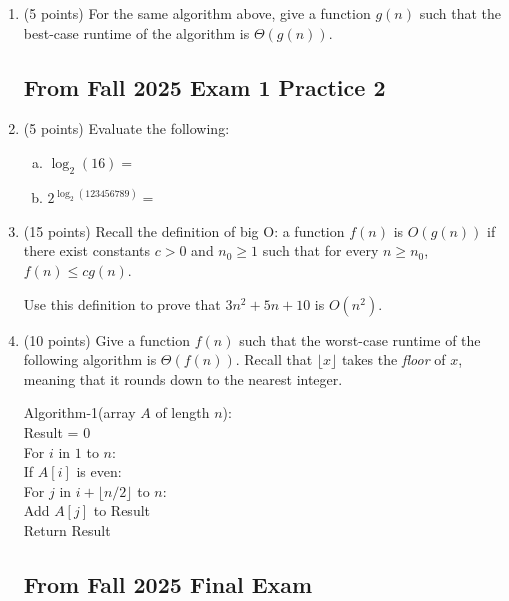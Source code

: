 \documentclass[11pt]{article}
\begin{document}
\begin{enumerate}
    \vspace{1in}

\item (5 points) 
For the same algorithm above, give a function $g(n)$ such that the best-case
runtime of the algorithm is $\Theta(g(n))$.


\newpage

\subsection*{From Fall 2025 Exam 1 Practice 2}
\item (5 points)
Evaluate the following:

\begin{enumerate}[(a)]
    \item $\log_2(16) = $ 
    \item $2^{\log_2(123456789)} = $
\end{enumerate}

\item (15 points) Recall the definition of big O: a function $f(n)$ is $O(g(n))$ if there
exist constants $c > 0$ and $n_0 \geq 1$ such that for every $n \geq n_0$, $f(n)
\leq c g(n)$.

Use this definition to prove that $3n^2 + 5n + 10$ is $O(n^2)$.

\vspace{3in}

\item (10 points) Give a function $f(n)$ such that the worst-case runtime of the following algorithm is $\Theta(f(n))$. 
 Recall that $\lfloor x \rfloor$ takes the \emph{floor} of $x$, meaning that it rounds down to the nearest integer.

    \begin{algo}
    Algorithm-1(array $A$ of length $n$):\+\\
    Result = 0\\
    For $i$ in $1$ to $n$:\+\\
    If $A[i]$ is even:\+\\
    For $j$ in $i + \lfloor n/2 \rfloor$ to $n$:\+\\
    Add $A[j]$ to Result\-\-\- \\
    Return Result
    \end{algo}



\newpage
\subsection*{From Fall 2025 Final Exam}


\end{enumerate}
\end{document}
